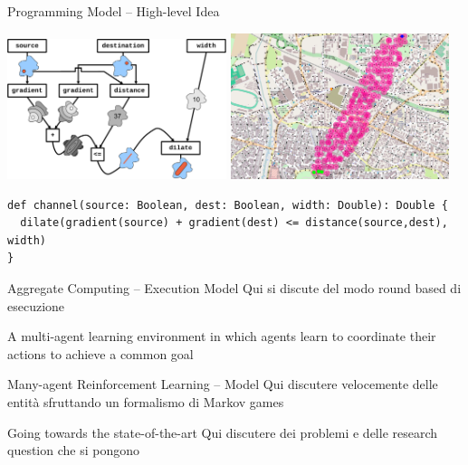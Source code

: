\documentclass[presentation, 9pt,169]{beamer}\mode<presentation>{\usetheme{AMSBolognaFC}}
\begin{document}
\begin{frame}[fragile]{Programming Model -- High-level Idea}
  \begin{center}
    \includegraphics[width=0.48\textwidth]{img/functions.pdf}
    \includegraphics[width=0.48\textwidth]{img/channel.png}
  \end{center}
\begin{verbatim}
def channel(source: Boolean, dest: Boolean, width: Double): Double {
  dilate(gradient(source) + gradient(dest) <= distance(source,dest), width)
}
  \end{verbatim}

\end{frame}
\begin{frame}{Aggregate Computing -- Execution Model}
Qui si discute del modo round based di esecuzione
\end{frame}
\begin{frame}[plain]
  \begin{center}
\huge{}
  \end{center}
  \begin{center}
    \large{A multi-agent learning environment in which agents learn to coordinate their actions to achieve a common goal}
  \end{center}
\end{frame} 
\begin{frame}{Many-agent Reinforcement Learning -- Model}
Qui discutere velocemente delle entità sfruttando un formalismo di Markov games
\end{frame}
\begin{frame}{Going towards the state-of-the-art}
Qui discutere dei problemi e delle research question che si pongono
\end{frame}
\end{document}
